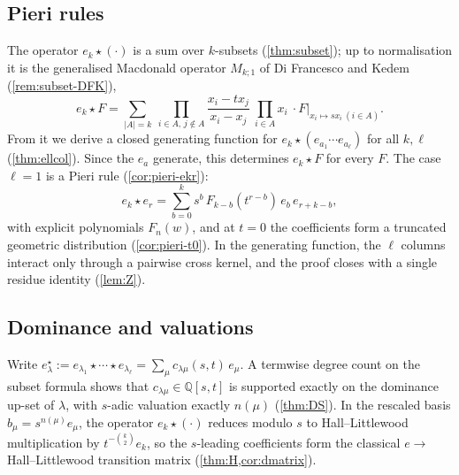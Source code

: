 \documentclass[11pt]{amsart}
\theoremstyle{definition}
\theoremstyle{remark}
\numberwithin{equation}{section}
\begin{document}
\subsection*{Pieri rules}
The operator $e_k\star(\cdot)$ is a sum over $k$-subsets (\cref{thm:subset}); up to normalisation it is the generalised Macdonald operator $M_{k;1}$ of Di Francesco and Kedem \cite{DFK19} (\cref{rem:subset-DFK}),
\[ e_k\star F=\sum_{|A|=k}\ \prod_{i\in A,\,j\notin A}\frac{x_i-tx_j}{x_i-x_j}\ \prod_{i\in A}x_i\ \cdot F\big|_{x_i\mapsto sx_i\ (i\in A)} . \]
From it we derive a closed generating function for $e_k\star(e_{a_1}\cdots e_{a_\ell})$ for all $k,\ell$ (\cref{thm:ellcol}). Since the $e_a$ generate, this determines $e_k\star F$ for every $F$. The case $\ell=1$ is a Pieri rule (\cref{cor:pieri-ekr}):
\[ e_k\star e_r=\sum_{b=0}^{k}s^b\,F_{k-b}(t^{r-b})\,e_b\,e_{r+k-b}, \]
with explicit polynomials $F_n(w)$, and at $t=0$ the coefficients form a truncated geometric distribution (\cref{cor:pieri-t0}). In the generating function, the $\ell$ columns interact only through a pairwise cross kernel, and the proof closes with a single residue identity (\cref{lem:Z}).

\subsection*{Dominance and valuations}
Write $e^\star_\lambda:=e_{\lambda_1}\star\cdots\star e_{\lambda_\ell}=\sum_\mu c_{\lambda\mu}(s,t)\,e_\mu$. A termwise degree count on the subset formula shows that $c_{\lambda\mu}\in\mathbb{Q}[s,t]$ is supported exactly on the dominance up-set of $\lambda$, with $s$-adic valuation exactly $n(\mu)$ (\cref{thm:DS}). In the rescaled basis $b_\mu=s^{n(\mu)}e_\mu$, the operator $e_k\star(\cdot)$ reduces modulo $s$ to Hall--Littlewood multiplication by $t^{-\binom k2}e_k$, so the $s$-leading coefficients form the classical $e\to$Hall--Littlewood transition matrix (\cref{thm:H,cor:dmatrix}).
\end{document}
